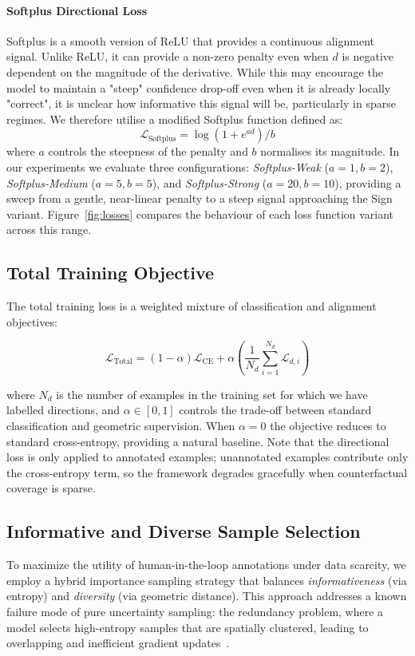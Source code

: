 \paragraph{Softplus Directional Loss}
Softplus is a smooth version of ReLU that provides a continuous alignment signal. Unlike ReLU, it can provide a non-zero penalty even when $d$ is negative dependent on the magnitude of the derivative. While this may encourage the model to maintain a "steep" confidence drop-off even when it is already locally "correct", it is unclear how informative this signal will be, particularly in sparse regimes. We therefore utilise a modified Softplus function defined as:
\begin{equation}
    \mathcal{L}_{\text{Softplus}} = \log(1 + e^{ad})/b
\end{equation}
where $a$ controls the steepness of the penalty and $b$ normalises its magnitude. In our experiments we evaluate three configurations: \emph{Softplus-Weak} ($a=1, b=2$), \emph{Softplus-Medium} ($a=5, b=5$), and \emph{Softplus-Strong} ($a=20, b=10$), providing a sweep from a gentle, near-linear penalty to a steep signal approaching the Sign variant. Figure~\ref{fig:losses} compares the behaviour of each loss function variant across this range.


\subsection{Total Training Objective} 

The total training loss is a weighted mixture of classification and alignment objectives:

\begin{equation}\label{eq:total_loss}
\mathcal{L}_{\text{Total}} = (1-\alpha)\mathcal{L}_{\text{CE}} + \alpha \left( \frac{1}{N_d} \sum^{N_d}_{i=1} \mathcal{L}_{d,i} \right)
\end{equation}

where $N_d$ is the number of examples in the training set for which we have labelled directions, and $\alpha \in [0,1]$ controls the trade-off between standard classification and geometric supervision. When $\alpha = 0$ the objective reduces to standard cross-entropy, providing a natural baseline. Note that the directional loss is only applied to annotated examples; unannotated examples contribute only the cross-entropy term, so the framework degrades gracefully when counterfactual coverage is sparse.

\subsection{Informative and Diverse Sample Selection}
To maximize the utility of human-in-the-loop annotations under data scarcity, we employ a hybrid importance sampling strategy that balances \textit{informativeness} (via entropy) and \textit{diversity} (via geometric distance). This approach addresses a known failure mode of pure uncertainty sampling: the redundancy problem, where a model selects high-entropy samples that are spatially clustered, leading to overlapping and inefficient gradient updates~\cite{shen2018deepactivelearningnamed}.

